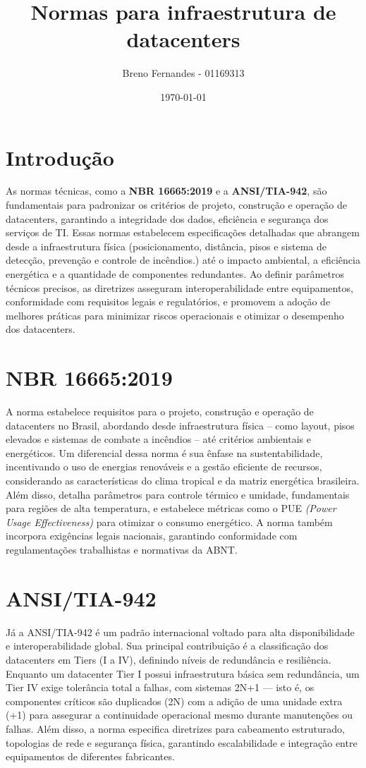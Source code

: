 \documentclass[12pt]{article}
\title{Normas para infraestrutura de datacenters}
\author{Breno Fernandes - 01169313}
\date{\today}
\begin{document}
\maketitle

\section*{Introdução}
As normas técnicas, como a \textbf{NBR 16665:2019} e a \textbf{ANSI/TIA-942}, são fundamentais para padronizar os critérios de projeto, construção e operação de datacenters, garantindo a integridade dos dados, eficiência e segurança dos serviços de TI. Essas normas estabelecem especificações detalhadas que abrangem desde a infraestrutura física (posicionamento, distância, pisos e sistema de detecção, prevenção e controle de incêndios.) até o impacto ambiental, a eficiência energética e a quantidade de componentes redundantes. Ao definir parâmetros técnicos precisos, as diretrizes asseguram interoperabilidade entre equipamentos, conformidade com requisitos legais e regulatórios, e promovem a adoção de melhores práticas para minimizar riscos operacionais e otimizar o desempenho dos datacenters.

\section*{NBR 16665:2019}
A norma estabelece requisitos para o projeto, construção e operação de datacenters no Brasil, abordando desde infraestrutura física – como layout, pisos elevados e sistemas de combate a incêndios – até critérios ambientais e energéticos. Um diferencial dessa norma é sua ênfase na sustentabilidade, incentivando o uso de energias renováveis e a gestão eficiente de recursos, considerando as características do clima tropical e da matriz energética brasileira. Além disso, detalha parâmetros para controle térmico e umidade, fundamentais para regiões de alta temperatura, e estabelece métricas como o PUE \textit{(Power Usage Effectiveness)} para otimizar o consumo energético. A norma também incorpora exigências legais nacionais, garantindo conformidade com regulamentações trabalhistas e normativas da ABNT.

\section*{ANSI/TIA-942}
Já a ANSI/TIA-942 é um padrão internacional voltado para alta disponibilidade e interoperabilidade global. Sua principal contribuição é a classificação dos datacenters em Tiers (I a IV), definindo níveis de redundância e resiliência. Enquanto um datacenter Tier I possui infraestrutura básica sem redundância, um Tier IV exige tolerância total a falhas, com sistemas 2N+1  — isto é, os componentes críticos são duplicados (2N) com a adição de uma unidade extra (+1) para assegurar a continuidade operacional mesmo durante manutenções ou falhas.  Além disso, a norma especifica diretrizes para cabeamento estruturado, topologias de rede e segurança física, garantindo escalabilidade e integração entre equipamentos de diferentes fabricantes.
\end{document}
